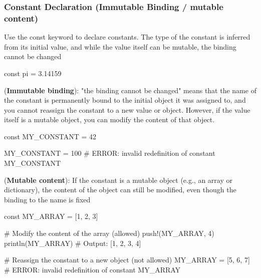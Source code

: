 \documentclass{report}
\begin{document}
    \subsubsection{Constant Declaration (Immutable Binding / mutable content)}
    \bigbreak \noindent  
    Use the const keyword to declare constants. The type of the constant is inferred from its initial value, and while the value itself can be mutable, the binding cannot be changed
    \bigbreak \noindent 
    \begin{jlcode}
    const pi = 3.14159
    \end{jlcode}
    \bigbreak \noindent 
    (\textbf{Immutable binding}): "the binding cannot be changed"  means that the name of the constant is permanently bound to the initial object it was assigned to, and you cannot reassign the constant to a new value or object. However, if the value itself is a mutable object, you can modify the content of that object.
    \bigbreak \noindent 
    \begin{jlcode}
    const MY_CONSTANT = 42

    MY_CONSTANT = 100  # ERROR: invalid redefinition of constant MY_CONSTANT
    \end{jlcode}
    \bigbreak \noindent 
    (\textbf{Mutable content}): If the constant is a mutable object (e.g., an array or dictionary), the content of the object can still be modified, even though the binding to the name is fixed
    \bigbreak \noindent 
    \begin{jlcode}
        const MY_ARRAY = [1, 2, 3]

        # Modify the content of the array (allowed)
        push!(MY_ARRAY, 4)
        println(MY_ARRAY)  # Output: [1, 2, 3, 4]

        # Reassign the constant to a new object (not allowed)
        MY_ARRAY = [5, 6, 7]  # ERROR: invalid redefinition of constant MY_ARRAY
    \end{jlcode}

    \bigbreak \noindent 
\end{document}
